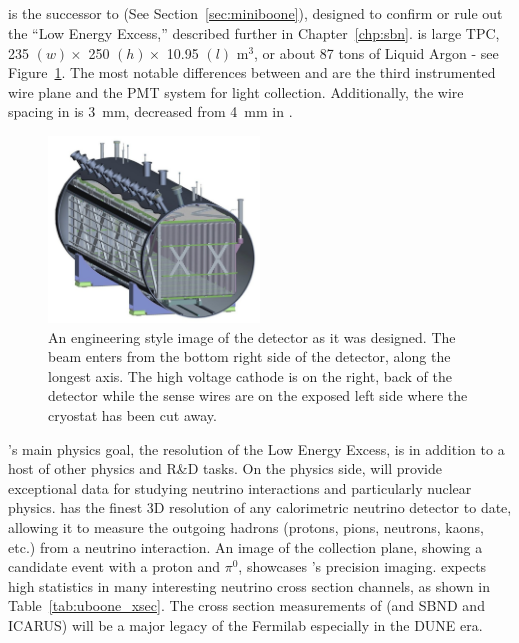 \subsection{\label{sec:microboone} \uboone}

\uboone is the successor to \MB \cite{miniboone} (See Section~\ref{sec:miniboone}), designed to confirm or rule out the \MB ``Low Energy Excess,'' described further in Chapter~\ref{chp:sbn}.  \uboone is large TPC, 235 $ (w) \times $ 250 $ (h) \times $ 10.95 $ (l) $ m$^3$, or about 87 tons of Liquid Argon - see Figure~\ref{fig:uboone_det}.  The most notable differences between \argoneut and \uboone are the third instrumented wire plane and the PMT system for light collection.  Additionally, the wire spacing in \uboone is 3~mm, decreased from 4~mm in \argoneut.

\begin{figure}[htb]
  \centering
  \includegraphics[width=0.5\textwidth]{lartpc_figures/uboone_tpc.jpg}
  \caption[\uboone Detector Design]{An engineering style image of the \uboone detector as it was designed.  The beam enters from the bottom right side of the detector, along the longest axis.  The high voltage cathode is on the right, back of the detector while the sense wires are on the exposed left side where the cryostat has been cut away.}
  \label{fig:uboone_det}
\end{figure}

\uboone's main physics goal, the resolution of the Low Energy Excess, is in addition to a host of other physics and R\&D tasks.  On the physics side, \uboone will provide exceptional data for studying neutrino interactions and particularly nuclear physics.  \uboone has the finest 3D resolution of any calorimetric neutrino detector to date, allowing it to measure the outgoing hadrons (protons, pions, neutrons, kaons, etc.) from a neutrino interaction.  An image of the \uboone collection plane, showing a \numu candidate event with a proton and $\pi^0$, showcases \uboone's precision imaging.  \uboone expects high statistics in many interesting neutrino cross section channels, as shown in Table~\ref{tab:uboone_xsec}.  The cross section measurements of \uboone (and SBND and ICARUS) will be a major legacy of the Fermilab \lartpcs especially in the DUNE\cite{DUNE} era.



